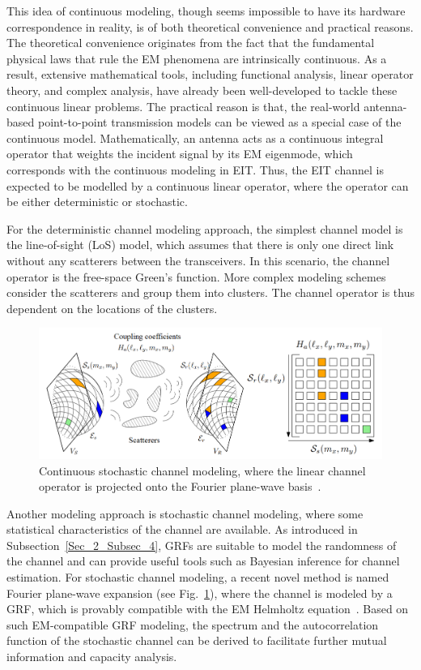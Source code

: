 \documentclass[journal,twocolumn]{IEEEtran}
\begin{document}
This idea of continuous modeling, though seems impossible to have its hardware correspondence in reality, is of both theoretical convenience and practical reasons. 
The theoretical convenience originates from the fact that the fundamental physical laws that rule the EM phenomena are intrinsically continuous. 
As a result, extensive mathematical tools, including functional analysis, linear operator theory, and complex analysis, have already been well-developed to tackle these continuous linear problems. 
The practical reason is that, the real-world antenna-based point-to-point transmission models can be viewed as a special case of the continuous model. 
Mathematically, an antenna acts as a continuous integral operator that weights the incident signal by its EM eigenmode, which corresponds with the continuous modeling in EIT. 
Thus, the EIT channel is expected to be modelled by a continuous linear operator, where the operator can be either deterministic or stochastic.

For the deterministic channel modeling approach, the simplest channel model is the line-of-sight (LoS) model, which assumes that there is only one direct link without any scatterers between the transceivers. In this scenario, the channel operator is the free-space Green's function. More complex modeling schemes consider the scatterers and group them into clusters. The channel operator is thus dependent on the locations of the clusters.

\begin{figure}
	\centering 
	\includegraphics[width=\linewidth]{figures/random_channel-new.png} 
	\caption{Continuous stochastic channel modeling, where the linear channel operator is projected onto the Fourier plane-wave basis~\cite{marzetta2022fourier}.} 
	\label{fig:marzetta}
\end{figure}
Another modeling approach is stochastic channel modeling, where some statistical characteristics of the channel are available. As introduced in Subsection~\ref{Sec_2_Subsec_4}, GRFs are suitable to model the randomness of the channel and can provide useful tools such as Bayesian inference for channel estimation. 
For stochastic channel modeling, a recent novel method is named Fourier plane-wave expansion (see Fig.~\ref{fig:marzetta}), where the channel is modeled by a GRF, which is provably compatible with the EM Helmholtz equation~\cite{marzetta2022fourier}. 
Based on such EM-compatible GRF modeling, the spectrum and the autocorrelation function of the stochastic channel can be derived to facilitate further mutual information and capacity analysis.
\end{document}
